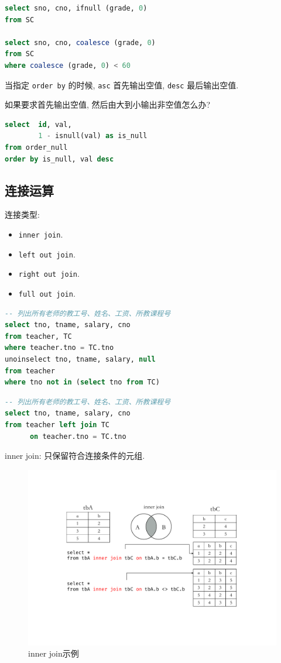 \begin{lstlisting}[language=SQL]
select sno, cno, ifnull (grade, 0)
from SC

select sno, cno, coalesce (grade, 0)
from SC
where coalesce (grade, 0) < 60
\end{lstlisting}

当指定 \verb|order by| 的时候, \verb|asc| 首先输出空值, \verb|desc| 最后输出空值.

如果要求首先输出空值, 然后由大到小输出非空值怎么办?
\begin{lstlisting}[language=SQL]
select  id, val,
        1 - isnull(val) as is_null
from order_null
order by is_null, val desc
\end{lstlisting}

\subsection{连接运算}

连接类型:
\begin{itemize}
  \item \verb|inner join|.
  \item \verb|left out join|.
  \item \verb|right out join|.
  \item \verb|full out join|.
\end{itemize}

\begin{lstlisting}[language=SQL, caption={不用外连接表达查询的例子}]
-- 列出所有老师的教工号、姓名、工资、所教课程号
select tno, tname, salary, cno
from teacher, TC
where teacher.tno = TC.tno
unoinselect tno, tname, salary, null
from teacher
where tno not in (select tno from TC)
\end{lstlisting}

\begin{lstlisting}[language=SQL, caption={用外连接表达查询的例子}]
-- 列出所有老师的教工号、姓名、工资、所教课程号
select tno, tname, salary, cno
from teacher left join TC
      on teacher.tno = TC.tno
\end{lstlisting}

inner join: 只保留符合连接条件的元组.
\begin{figure}[H]
    \centering
    \includegraphics[width=.55\textwidth]{figure/inner_join.pdf}
    \caption{inner join示例}
\end{figure}

